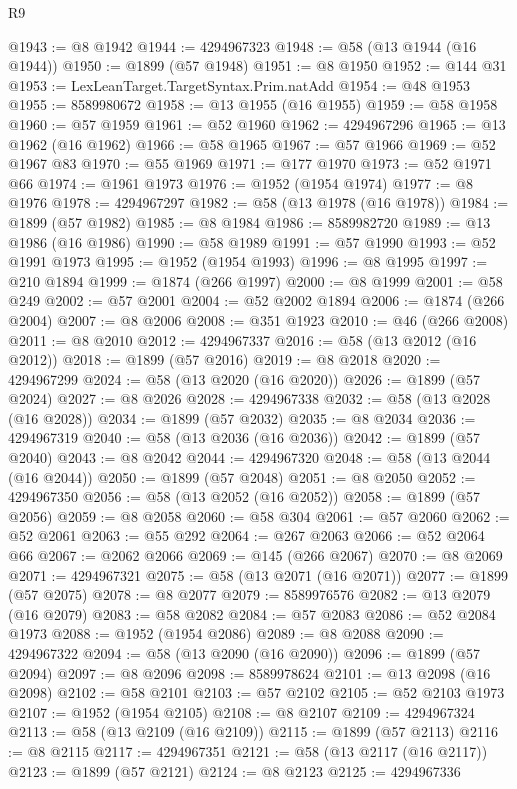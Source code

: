 \begin{lexlean}{R9}
\begin{coremodule}
@1943 := @8 @1942
@1944 := 4294967323
@1948 := @58 (@13 @1944 (@16 @1944))
@1950 := @1899 (@57 @1948)
@1951 := @8 @1950
@1952 := @144 @31
@1953 := LexLeanTarget.TargetSyntax.Prim.natAdd
@1954 := @48 @1953
@1955 := 8589980672
@1958 := @13 @1955 (@16 @1955)
@1959 := @58 @1958
@1960 := @57 @1959
@1961 := @52 @1960
@1962 := 4294967296
@1965 := @13 @1962 (@16 @1962)
@1966 := @58 @1965
@1967 := @57 @1966
@1969 := @52 @1967 @83
@1970 := @55 @1969
@1971 := @177 @1970
@1973 := @52 @1971 @66
@1974 := @1961 @1973
@1976 := @1952 (@1954 @1974)
@1977 := @8 @1976
@1978 := 4294967297
@1982 := @58 (@13 @1978 (@16 @1978))
@1984 := @1899 (@57 @1982)
@1985 := @8 @1984
@1986 := 8589982720
@1989 := @13 @1986 (@16 @1986)
@1990 := @58 @1989
@1991 := @57 @1990
@1993 := @52 @1991 @1973
@1995 := @1952 (@1954 @1993)
@1996 := @8 @1995
@1997 := @210 @1894
@1999 := @1874 (@266 @1997)
@2000 := @8 @1999
@2001 := @58 @249
@2002 := @57 @2001
@2004 := @52 @2002 @1894
@2006 := @1874 (@266 @2004)
@2007 := @8 @2006
@2008 := @351 @1923
@2010 := @46 (@266 @2008)
@2011 := @8 @2010
@2012 := 4294967337
@2016 := @58 (@13 @2012 (@16 @2012))
@2018 := @1899 (@57 @2016)
@2019 := @8 @2018
@2020 := 4294967299
@2024 := @58 (@13 @2020 (@16 @2020))
@2026 := @1899 (@57 @2024)
@2027 := @8 @2026
@2028 := 4294967338
@2032 := @58 (@13 @2028 (@16 @2028))
@2034 := @1899 (@57 @2032)
@2035 := @8 @2034
@2036 := 4294967319
@2040 := @58 (@13 @2036 (@16 @2036))
@2042 := @1899 (@57 @2040)
@2043 := @8 @2042
@2044 := 4294967320
@2048 := @58 (@13 @2044 (@16 @2044))
@2050 := @1899 (@57 @2048)
@2051 := @8 @2050
@2052 := 4294967350
@2056 := @58 (@13 @2052 (@16 @2052))
@2058 := @1899 (@57 @2056)
@2059 := @8 @2058
@2060 := @58 @304
@2061 := @57 @2060
@2062 := @52 @2061
@2063 := @55 @292
@2064 := @267 @2063
@2066 := @52 @2064 @66
@2067 := @2062 @2066
@2069 := @145 (@266 @2067)
@2070 := @8 @2069
@2071 := 4294967321
@2075 := @58 (@13 @2071 (@16 @2071))
@2077 := @1899 (@57 @2075)
@2078 := @8 @2077
@2079 := 8589976576
@2082 := @13 @2079 (@16 @2079)
@2083 := @58 @2082
@2084 := @57 @2083
@2086 := @52 @2084 @1973
@2088 := @1952 (@1954 @2086)
@2089 := @8 @2088
@2090 := 4294967322
@2094 := @58 (@13 @2090 (@16 @2090))
@2096 := @1899 (@57 @2094)
@2097 := @8 @2096
@2098 := 8589978624
@2101 := @13 @2098 (@16 @2098)
@2102 := @58 @2101
@2103 := @57 @2102
@2105 := @52 @2103 @1973
@2107 := @1952 (@1954 @2105)
@2108 := @8 @2107
@2109 := 4294967324
@2113 := @58 (@13 @2109 (@16 @2109))
@2115 := @1899 (@57 @2113)
@2116 := @8 @2115
@2117 := 4294967351
@2121 := @58 (@13 @2117 (@16 @2117))
@2123 := @1899 (@57 @2121)
@2124 := @8 @2123
@2125 := 4294967336

\end{coremodule}
\end{lexlean}
